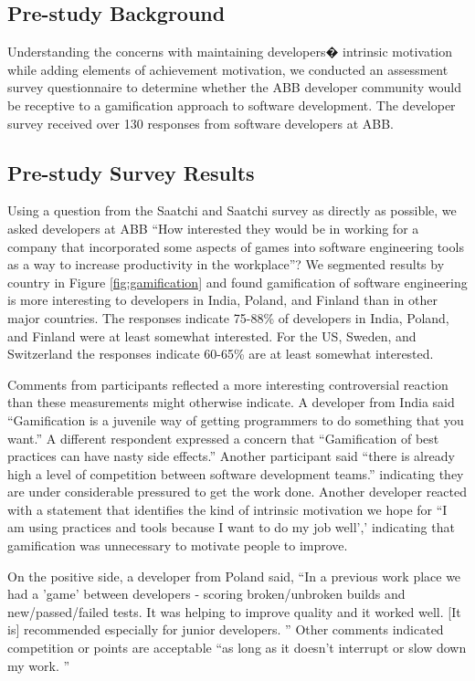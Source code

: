 \documentclass{sig-alternate}
\begin{document}
\subsection{Pre-study Background}

Understanding the concerns with maintaining developers� intrinsic motivation while adding elements of achievement motivation, we conducted an assessment survey questionnaire to determine whether the ABB developer community would be receptive to a gamification approach to software development.  The developer survey received over 130 responses from software developers at ABB.

\subsection{Pre-study Survey Results}

Using a question from the Saatchi and Saatchi survey \cite{wbsnipes:SaatchiGameification} as directly as possible, we asked developers at ABB ``How interested they would be in working for a company that incorporated some aspects of games into software engineering tools as a way to increase productivity in the workplace''?  We segmented results by country in Figure \ref{fig:gamification} and found gamification of software engineering is more interesting to developers in India, Poland, and Finland than in other major countries.  The responses indicate 75-88\% of developers in India, Poland, and Finland were at least somewhat interested.  For the US, Sweden, and Switzerland the responses indicate 60-65\% are at least somewhat interested.  

Comments from participants reflected a more interesting controversial reaction than these measurements might otherwise indicate.  A developer from India said ``Gamification is a juvenile way of getting programmers to do something that you want.''  A different respondent expressed a concern that ``Gamification of best practices can have nasty side effects.''  Another participant said ``there is already high a level of competition between software development teams.'' indicating they are under considerable pressured to get the work done.  Another developer reacted with a statement that identifies the kind of intrinsic motivation we hope for ``I am using practices and tools because I want to do my job well',' indicating that gamification was unnecessary to motivate people to improve.

On the positive side, a developer from Poland said, ``In a previous work place we had a 'game' between developers - scoring broken/unbroken builds and new/passed/failed tests. It was helping to improve quality and it worked well. [It is] recommended especially for junior developers. '' Other comments indicated competition or points are acceptable ``as long as it doesn't interrupt or slow down my work. ''
\end{document}

